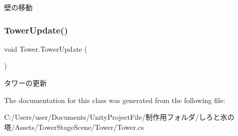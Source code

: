 壁の移動 

\mbox{\label{class_tower_a4ea25831f8d1fcaac113e6aa4acaa4aa}} 
\subsubsection{\texorpdfstring{Tower\+Update()}{TowerUpdate()}}
{\footnotesize\ttfamily void Tower.\+Tower\+Update (\begin{DoxyParamCaption}{ }\end{DoxyParamCaption})\hspace{0.3cm}{\ttfamily [inline]}}



タワーの更新 



The documentation for this class was generated from the following file\+:\begin{DoxyCompactItemize}
\item 
C\+:/\+Users/user/\+Documents/\+Unity\+Project\+File/制作用フォルダ/しろと氷の塔/\+Assets/\+Tower\+Stage\+Scene/\+Tower/Tower.\+cs\end{DoxyCompactItemize}
